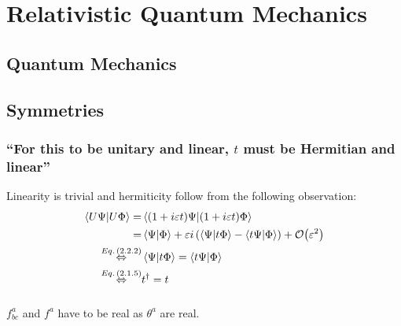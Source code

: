 \section{Relativistic Quantum Mechanics}\label{sec:chapter2}

\subsection{Quantum Mechanics}\label{susec:2_1}

\subsection{Symmetries}\label{susec:2_2}
\subsubsection{\enquote{For this to be unitary and linear, $t$ must be Hermitian and linear} }\label{sususec:2_2_p51_1}
Linearity is trivial and hermiticity follow from the following observation:
\begin{align*} 
	\innerproduct{U\Psi}{U\Phi}=&\innerproduct{(1+i\varepsilon t) \Psi}{(1+i\varepsilon t) \Phi}\\
	=&\innerproduct{\Psi}{\Phi}+\varepsilon i\left(\innerproduct{\Psi}{t \Phi}-\innerproduct{t\Psi}{ \Phi}\right)+\order{\varepsilon^2}\\
	\overset{\eq{2.2.2}}{\Leftrightarrow}&\innerproduct{\Psi}{t \Phi}=\innerproduct{t\Psi}{\Phi}\\
	\overset{\eq{2.1.5}}{\Leftrightarrow}&t^\dagger=t
\end{align*}

\subsubsection{ }
$f^a_{bc}$ and $f^a$ have to be real as $\theta^a$ are real.

